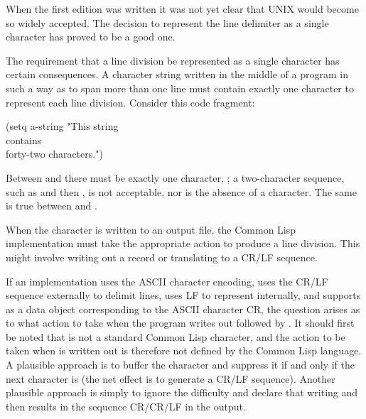 \begin{newer}
When the first edition was written it was not yet clear that UNIX would
become so widely accepted.  The decision to represent
the line delimiter as a single character has proved to be a good one.
\end{newer}

The requirement that a line division be represented as a single character
has certain consequences.  A character string
written in the middle of a program in such a way as to span more than
one line must contain exactly one character to represent each line division.
Consider this code fragment:
\begin{lisp}
(setq a-string "This string \\
contains \\
forty-two characters.")
\end{lisp}
Between  and  there must be exactly one character,
; a two-character sequence, such as  and then
, is not acceptable, nor is the absence of a character.
The same is true between  and .

When the character  is written to an output file,
the Common Lisp implementation must take the appropriate action
to produce a line division.  This might involve writing out a
record or translating  to a CR/LF sequence.

\beforenoterule
\begin{implementation}
If an implementation uses the ASCII character encoding,
uses the CR/LF sequence externally to delimit lines,
uses LF to represent  internally, and supports 
as a data object corresponding to the ASCII character CR, the
question arises as to what action to take when the program
writes out  followed by .
It should first be noted that  is not a standard Common Lisp
character, and the action to be taken when  is written out
is therefore not defined by the Common Lisp language.  A plausible approach
is to buffer the  character and suppress it if and only if the
next character is  (the net effect is to generate a CR/LF
sequence).
Another plausible
approach is simply to ignore
the difficulty and declare that writing  and then
 results in the sequence CR/CR/LF in the output.
\end{implementation}
\afternoterule

